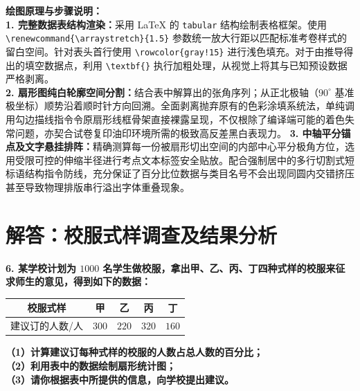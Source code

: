 \vspace{0.6cm}

{\small\color{blue!70!black}
\textbf{绘图原理与步骤说明：}\\
\textbf{1. 完整数据表结构渲染：}采用 LaTeX 的 \texttt{tabular} 结构绘制表格框架。使用 \texttt{\textbackslash renewcommand\{\textbackslash arraystretch\}\{1.5\}} 参数统一放大行距以匹配标准考卷样式的留白空间。针对表头首行使用 \texttt{\textbackslash rowcolor\{gray!15\}} 进行浅色填充。对于由推导得出的填空数据点，利用 \texttt{\textbackslash textbf\{\}} 执行加粗处理，从视觉上将其与已知预设数据严格剥离。\\
\textbf{2. 扇形图纯白轮廓空间分割：}结合表中解算出的张角序列；从正北极轴（$90^\circ$ 基准极坐标）顺势沿着顺时针方向回溯。全面剥离抛弃原有的色彩涂填系统法，单纯调用勾边描线指令令原扇形线框骨架直接裸露呈现，不仅根除了编译端可能的着色失常问题，亦契合试卷复印油印环境所需的极致高反差黑白表现力。
\textbf{3. 中轴平分锚点及文字悬挂排阵：}精确测算每一份被扇形切出空间的内部中心平分极角方位，选用受限可控的伸缩半径进行考点文本标签安全贴放。配合强制居中的多行切割式短标语结构指令防线，充分保证了百分比位数据与类目名号不会出现同圆内交错挤压甚至导致物理排版串行溢出字体重叠现象。
}

\newpage



\section{解答：校服式样调查及结果分析}

\vspace{0.6cm}

\textbf{6. 某学校计划为 $1000$ 名学生做校服，拿出甲、乙、丙、丁四种式样的校服来征求师生的意见，得到如下的数据：}

\vspace{0.2cm}
\begin{center}
\renewcommand{\arraystretch}{1.5}
\begin{tabular}{|c|c|c|c|c|}
  \hline
  \rowcolor{gray!15} 
  校服式样 & 甲 & 乙 & 丙 & 丁 \\
  \hline
  建议订的人数/人 & $300$ & $220$ & $320$ & $160$ \\
  \hline
\end{tabular}
\end{center}
\vspace{0.2cm}

\textbf{（1）计算建议订每种式样的校服的人数占总人数的百分比；}\\
\textbf{（2）利用表中的数据绘制扇形统计图；}\\
\textbf{（3）请你根据表中所提供的信息，向学校提出建议。}

